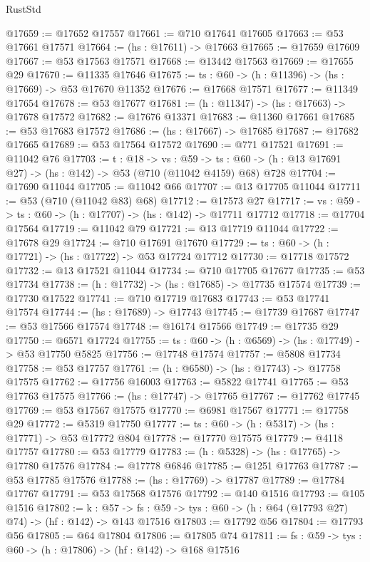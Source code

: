 \begin{lexlean}{RustStd}
\begin{coremodule}
@17659 := @17652 @17557
@17661 := @710 @17641 @17605
@17663 := @53 @17661 @17571
@17664 := (hs : @17611) -> @17663
@17665 := @17659 @17609
@17667 := @53 @17563 @17571
@17668 := @13442 @17563
@17669 := @17655 @29
@17670 := @11335 @17646
@17675 := {ts : @60} -> (h : @11396) -> (hs : @17669) -> @53 @17670 @11352
@17676 := @17668 @17571
@17677 := @11349 @17654
@17678 := @53 @17677
@17681 := (h : @11347) -> (hs : @17663) -> @17678 @17572
@17682 := @17676 @13371
@17683 := @11360 @17661
@17685 := @53 @17683 @17572
@17686 := (hs : @17667) -> @17685
@17687 := @17682 @17665
@17689 := @53 @17564 @17572
@17690 := @771 @17521
@17691 := @11042 @76
@17703 := {t : @18} ->
  {vs : @59} ->
  {ts : @60} -> (h : @13 @17691 @27) -> (hs : @142) -> @53 (@710 (@11042 @4159) @68) @728
@17704 := @17690 @11044
@17705 := @11042 @66
@17707 := @13 @17705 @11044
@17711 := @53 (@710 (@11042 @83) @68)
@17712 := @17573 @27
@17717 := {vs : @59} -> {ts : @60} -> (h : @17707) -> (hs : @142) -> @17711 @17712
@17718 := @17704 @17564
@17719 := @11042 @79
@17721 := @13 @17719 @11044
@17722 := @17678 @29
@17724 := @710 @17691 @17670
@17729 := {ts : @60} -> (h : @17721) -> (hs : @17722) -> @53 @17724 @17712
@17730 := @17718 @17572
@17732 := @13 @17521 @11044
@17734 := @710 @17705 @17677
@17735 := @53 @17734
@17738 := (h : @17732) -> (hs : @17685) -> @17735 @17574
@17739 := @17730 @17522
@17741 := @710 @17719 @17683
@17743 := @53 @17741 @17574
@17744 := (hs : @17689) -> @17743
@17745 := @17739 @17687
@17747 := @53 @17566 @17574
@17748 := @16174 @17566
@17749 := @17735 @29
@17750 := @6571 @17724
@17755 := {ts : @60} -> (h : @6569) -> (hs : @17749) -> @53 @17750 @5825
@17756 := @17748 @17574
@17757 := @5808 @17734
@17758 := @53 @17757
@17761 := (h : @6580) -> (hs : @17743) -> @17758 @17575
@17762 := @17756 @16003
@17763 := @5822 @17741
@17765 := @53 @17763 @17575
@17766 := (hs : @17747) -> @17765
@17767 := @17762 @17745
@17769 := @53 @17567 @17575
@17770 := @6981 @17567
@17771 := @17758 @29
@17772 := @5319 @17750
@17777 := {ts : @60} -> (h : @5317) -> (hs : @17771) -> @53 @17772 @804
@17778 := @17770 @17575
@17779 := @4118 @17757
@17780 := @53 @17779
@17783 := (h : @5328) -> (hs : @17765) -> @17780 @17576
@17784 := @17778 @6846
@17785 := @1251 @17763
@17787 := @53 @17785 @17576
@17788 := (hs : @17769) -> @17787
@17789 := @17784 @17767
@17791 := @53 @17568 @17576
@17792 := @140 @1516
@17793 := @105 @1516
@17802 := {k : @57} ->
  {fs : @59} -> {tys : @60} -> (h : @64 (@17793 @27) @74) -> (hf : @142) -> @143 @17516
@17803 := @17792 @56
@17804 := @17793 @56
@17805 := @64 @17804
@17806 := @17805 @74
@17811 := {fs : @59} -> {tys : @60} -> (h : @17806) -> (hf : @142) -> @168 @17516

\end{coremodule}
\end{lexlean}
